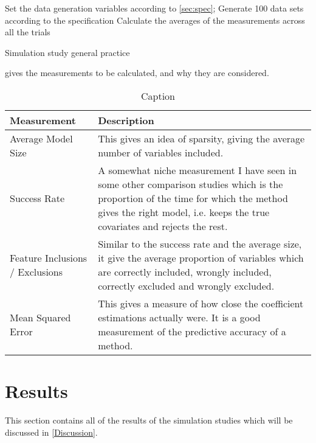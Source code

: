 \begin{algorithm}[H]
    Set the data generation variables according to \cref{sec:spec};
    Generate 100 data sets according to the specification\;
     {
        Calculate the averages of the measurements across all the trials\;
    }
    \caption{Simulation study general practice}\label{alg:sim-study-process}
\end{algorithm}

 gives the measurements to be calculated, and why they are considered. 

\begin{table}[ht]
    \centering
    \begin{tabular}{|p{3cm}|p{8cm}|}
        \hline
         \textbf{Measurement} & \textbf{Description} \\
         \hline
         Average Model Size & This gives an idea of sparsity, giving the average number of variables included.\\
         \hline
         Success Rate & A somewhat niche measurement I have seen in some other comparison studies which is the proportion of the time for which the method gives the right model, i.e. keeps the true covariates and rejects the rest.\\
         \hline
         Feature Inclusions / Exclusions & Similar to the success rate and the average size, it give the average proportion of variables which are correctly included, wrongly included, correctly excluded and wrongly excluded.\\
         \hline
         Mean Squared Error & This gives a measure of how close the coefficient estimations actually were. It is a good measurement of the predictive accuracy of a method.\\
         \hline
    \end{tabular}
    \caption{Caption}
    \label{tbl:measurement-spec}
\end{table}

\section{Results}\label{sec:results}

This section contains all of the results of the simulation studies which will be discussed in \cref{Discussion}.

